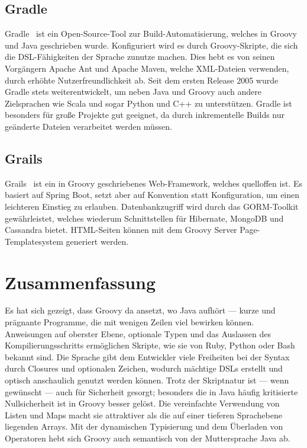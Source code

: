 \documentclass[a4paper]{article}
\begin{document}
\subsection{Gradle}\label{subsec:gradle}

Gradle~\cite{gradle} ist ein Open-Source-Tool zur Build-Automatisierung, welches in Groovy und Java geschrieben wurde.
Konfiguriert wird es durch Groovy-Skripte, die sich die DSL-Fähigkeiten der Sprache zunutze machen.
Dies hebt es von seinen Vorgängern Apache Ant und Apache Maven, welche XML-Dateien verwenden, durch erhöhte Nutzerfreundlichkeit ab.
Seit dem ersten Release 2005 wurde Gradle stets weiterentwickelt, um neben Java und Groovy auch andere Zielsprachen wie Scala und sogar Python und C++ zu unterstützen.
Gradle ist besonders für große Projekte gut geeignet, da durch inkrementelle Builds nur geänderte Dateien verarbeitet werden müssen.

\subsection{Grails}\label{subsec:grails}

Grails~\cite{grails} ist ein in Groovy geschriebenes Web-Framework, welches quelloffen ist.
Es basiert auf Spring Boot, setzt aber auf Konvention statt Konfiguration, um einen leichteren Einstieg zu erlauben.
Datenbankzugriff wird durch das GORM-Toolkit gewährleistet, welches wiederum Schnittstellen für Hibernate, MongoDB und Cassandra bietet.
HTML-Seiten können mit dem Groovy Server Page-Templatesystem generiert werden.


\section{Zusammenfassung}\label{sec:zusammenfassung}

Es hat sich gezeigt, dass Groovy da ansetzt, wo Java aufhört --- kurze und prägnante Programme, die mit wenigen Zeilen viel bewirken können.
Anweisungen auf oberster Ebene, optionale Typen und das Auslassen des Kompilierungsschritts ermöglichen Skripte, wie sie von Ruby, Python oder Bash bekannt sind.
Die Sprache gibt dem Entwickler viele Freiheiten bei der Syntax durch Closures und optionalen Zeichen, wodurch mächtige DSLs erstellt und optisch anschaulich genutzt werden können.
Trotz der Skriptnatur ist --- wenn gewünscht --- auch für Sicherheit gesorgt;
besonders die in Java häufig kritisierte Nullsicherheit ist in Groovy besser gelöst.
Die vereinfachte Verwendung von Listen und Maps macht sie attraktiver als die auf einer tieferen Sprachebene liegenden Arrays.
Mit der dynamischen Typisierung und dem Überladen von Operatoren hebt sich Groovy auch semantisch von der Muttersprache Java ab.
\end{document}
